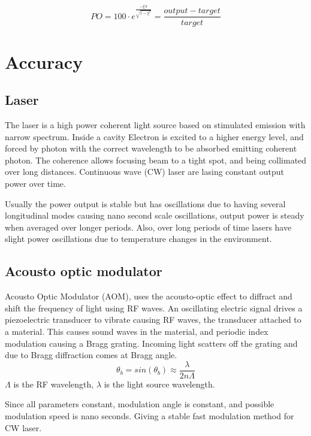 \documentclass[\main/master.tex]{subfiles}
\begin{document}
\begin{equation}
PO = 100\cdot e ^{\frac{-\xi\pi}{\sqrt{1-\xi^2}}} = \frac{output-target}{target}   \label{eqn:percentage_overshoot}
\end{equation}
 
\section{Accuracy}

\subsection{Laser}


The laser is a high power coherent light source based on stimulated emission with narrow spectrum. Inside a cavity Electron is excited to a higher energy level, and forced by photon with the correct wavelength to be absorbed emitting coherent photon. The coherence allows focusing beam to a tight spot, and being collimated over long distances. Continuous wave (CW) laser are lasing constant output power over time.



\par\noindent
Usually the power output is stable but has oscillations due to having several longitudinal modes causing nano second scale oscillations, output power is steady when averaged over longer periods. Also, over long periods of time lasers have slight power oscillations due to temperature changes in the environment.

\subsection{Acousto optic modulator}
Acousto Optic Modulator (AOM), uses the acousto-optic effect to diffract and shift the frequency of light using RF waves. An oscillating electric signal drives a piezoelectric transducer to vibrate causing RF waves, the transducer attached to a material. This causes sound waves in the material, and periodic index modulation causing a Bragg grating. Incoming light scatters off the grating and due to Bragg diffraction comes at Bragg angle.
\begin{equation}
\theta_b = sin(\theta_b)\approx \frac{\lambda}{2n\Lambda} \label{eqn:aom angle}
\end{equation} 
$\Lambda$ is the RF wavelength, $\lambda$ is the light source wavelength. 
\par\noindent
Since all parameters constant, modulation angle is constant, and possible modulation speed is nano seconds. Giving a stable fast modulation method for CW laser.
\end{document}
